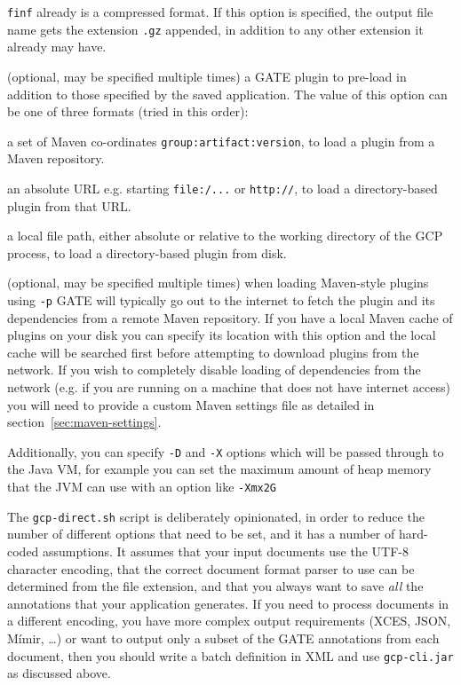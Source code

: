 \verb!finf! already is a compressed format. If this option is specified, the
output file name gets the extension \verb!.gz! appended, in addition to 
any other extension it already may have.
\item[-p] (optional, may be specified multiple times) a GATE plugin to pre-load
  in addition to those specified by the saved application.  The value of this
  option can be one of three formats (tried in this order):
  \ben
  \item a set of Maven co-ordinates \verb!group:artifact:version!, to load
    a plugin from a Maven repository.
  \item an absolute URL e.g. starting \verb!file:/...! or \verb!http://!, to
    load a directory-based plugin from that URL.
  \item a local file path, either absolute or relative to the working directory
    of the GCP process, to load a directory-based plugin from disk.
  \een
\item[-C] (optional, may be specified multiple times) when loading Maven-style
  plugins using \verb!-p! GATE will typically go out to the internet to fetch the
  plugin and its dependencies from a remote Maven repository.  If you have a local
  Maven cache of plugins on your disk you can specify its location with this option
  and the local cache will be searched first before attempting to download plugins
  from the network.  If you wish to completely disable loading of dependencies from
  the network (e.g. if you are running on a machine that does not have internet
  access) you will need to provide a custom Maven settings file as detailed in
  section~\ref{sec:maven-settings}.
\ede

Additionally, you can specify \verb!-D! and \verb!-X! options which will be
passed through to the Java VM, for example you can set the maximum amount of
heap memory that the JVM can use with an option like \verb!-Xmx2G!

The \verb!gcp-direct.sh! script is deliberately opinionated, in order to reduce
the number of different options that need to be set, and it has a number of
hard-coded assumptions.  It assumes that your input documents use the UTF-8
character encoding, that the correct document format parser to use can be
determined from the file extension, and that you always want to save \emph{all}
the annotations that your application generates.  If you need to process
documents in a different encoding, you have more complex output requirements
(XCES, JSON, M\'{i}mir, \ldots) or want to output only a subset of the GATE
annotations from each document, then you should write a batch definition in XML
and use \verb!gcp-cli.jar! as discussed above.

